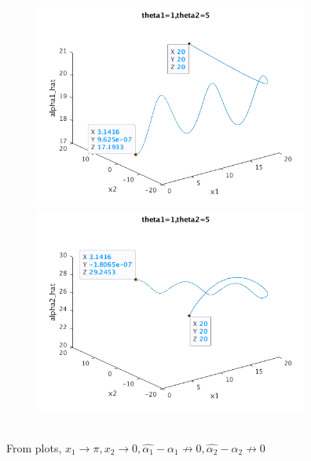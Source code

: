 \documentclass[12pt,letter]{article}
\begin{document}
\begin{itemize}
\begin{figure}[h]
  \includegraphics[width=9cm,keepaspectratio]{matlab/3_11/q_3_11_thetas_1_5_alpha1_convergence.png}
  \includegraphics[width=9cm,keepaspectratio]{matlab/3_11/q_3_11_thetas_1_5_alpha2_convergence.png}
\end{figure}\\

From plots, $x_1 \to \pi ,x_2 \to 0, \hat{\alpha_1}-\alpha_1 \not \to 0, \hat{\alpha_2}-\alpha_2\not \to 0$\\

\end{itemize}
\end{document}
